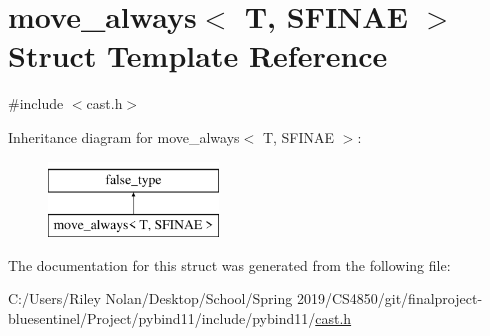 \hypertarget{structmove__always}{}\section{move\+\_\+always$<$ T, S\+F\+I\+N\+AE $>$ Struct Template Reference}
\label{structmove__always}


{\ttfamily \#include $<$cast.\+h$>$}

Inheritance diagram for move\+\_\+always$<$ T, S\+F\+I\+N\+AE $>$\+:\begin{figure}[H]
\begin{center}
\leavevmode
\includegraphics[height=2.000000cm]{structmove__always}
\end{center}
\end{figure}


The documentation for this struct was generated from the following file\+:\begin{DoxyCompactItemize}
\item 
C\+:/\+Users/\+Riley Nolan/\+Desktop/\+School/\+Spring 2019/\+C\+S4850/git/finalproject-\/bluesentinel/\+Project/pybind11/include/pybind11/\mbox{\hyperlink{cast_8h}{cast.\+h}}\end{DoxyCompactItemize}
